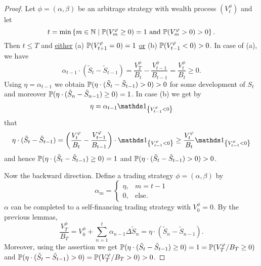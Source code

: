 \documentclass[12pt]{amsart}
\begin{document}
\begin{proof}
    Let \(\phi = (\alpha, \beta)\) be an arbitrage strategy with wealth process \((V_t^\phi)\) and let \[
        t = \min\set{m \in \N \mid \P(V_m^\phi \geq 0) = 1 \text{ and } \P(V_m^\phi > 0) > 0}.
    \]
    Then \(t \leq T\) and \underline{either} (a) \(\P(V_{t+1}^\phi = 0) = 1\) \underline{or} (b) \(\P(V_{t-1}^\phi < 0) > 0\). In case of (a), we have \[
        \alpha_{t-1} \cdot (\tilde{S}_t - \tilde{S}_{t-1}) = \frac{V_T^\phi}{B_t} - \frac{V_{t-1}^\phi}{B_{t-1}} = \frac{V_t^\phi}{B_t} \geq 0.
    \]
    Using \(\eta = \alpha_{t-1}\) we obtain \(\P(\eta \cdot (\tilde{S}_t - \tilde{S}_{t-1}) > 0) > 0\) for some development of \(S_t\) and moreover \(\P(\eta \cdot (\tilde{S}_n - \tilde{S}_{n-1}) \geq 0) = 1\). In case (b) we get by \[
        \eta = \alpha_{t-1} \indic[V_{t-1}^\phi < 0]
    \]
    that \[
        \eta \cdot (\tilde{S}_t - \tilde{S}_{t-1}) = \left(\frac{V_t^\phi}{B_t} - \frac{V_{t-1}^\phi}{B_{t-1}}\right) \cdot \indic[V_{t-1}^\phi < 0] \geq \frac{V_t^\phi}{B_t} \indic[V_{t-1}^\phi < 0]
    \]
    and hence \(\P(\eta \cdot (\tilde{S}_t - \tilde{S}_{t-1}) \geq 0) = 1\) and \(\P(\eta \cdot (\tilde{S}_t - \tilde{S}_{t-1}) > 0) > 0\).

    Now the backward direction. Define a trading strategy \(\phi = (\alpha, \beta)\) by \[
        \alpha_m = \begin{cases}
            \eta, &m=t-1\\
            0, &\text{else}.
        \end{cases}
    \]
    \(\alpha\) can be completed to a self-financing trading strategy  with \(V_0^\phi = 0\). By the previous lemmas, \[
        \frac{V_T^\phi}{B_T} = V_0^\phi + \sum_{n=1}^t \alpha_{n-1}\Delta \tilde{S}_n = \eta \cdot (\tilde{S}_n - \tilde{S}_{n-1}).
    \]
    Moreover, using the assertion we get \(\P(\eta \cdot (\tilde{S}_t - \tilde{S}_{t-1}) \geq 0) = 1 = \P(V_T^\phi/B_T \geq 0)\) and \(\P(\eta \cdot (\tilde{S}_t - \tilde{S}_{t-1}) > 0) = \P(V_T^\phi/B_T > 0) > 0\).
\end{proof}
\end{document}
